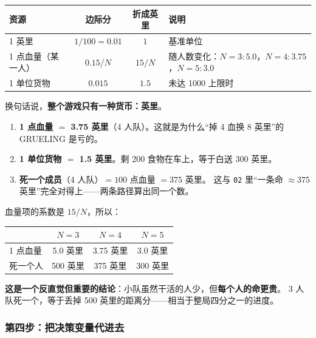 \documentclass[UTF8,11pt,a4paper]{ctexart}
\begin{document}
\begin{center}
\begin{tabular}{@{}lccl@{}}
\toprule
\textbf{资源} & \textbf{边际分} & \textbf{折成英里} & \textbf{说明} \\
\midrule
1 英里 & $1/100=0.01$ & $1$ & 基准单位 \\
1 点血量（某一人） & $0.15/N$ & $15/N$ & 随人数变化：$N{=}3{:}5.0$，$N{=}4{:}3.75$，$N{=}5{:}3.0$ \\
1 单位货物 & $0.015$ & $1.5$ & 未达 1000 上限时 \\
\bottomrule
\end{tabular}
\end{center}

\noindent 换句话说，\textbf{整个游戏只有一种货币：英里}。

\begin{keybox}[title={三个可以直接用于决策的换算}]
\begin{enumerate}[leftmargin=1.6em]
  \item \textbf{1 点血量 $=$ 3.75 英里}（4 人队）。这就是为什么“掉 4 血换 8 英里”的 GRUELING 是亏的。
  \item \textbf{1 单位货物 $=$ 1.5 英里}。剩 200 食物在车上，等于白送 300 英里。
  \item \textbf{死一个成员}（4 人队）$=100$ 点血量 $=375$ 英里。
        这与 \texttt{02} 里“一条命 $\approx375$ 英里”完全对得上——两条路径算出同一个数。
\end{enumerate}
\end{keybox}

\begin{warnbox}[title={人数越少，每个人越值钱}]
血量项的系数是 $15/N$，所以：
\begin{center}
\begin{tabular}{@{}lccc@{}}
\toprule
& $N=3$ & $N=4$ & $N=5$ \\
\midrule
1 点血量 & 5.0 英里 & 3.75 英里 & 3.0 英里 \\
死一个人 & 500 英里 & 375 英里 & 300 英里 \\
\bottomrule
\end{tabular}
\end{center}
\textbf{这是一个反直觉但重要的结论}：小队虽然干活的人少，但\textbf{每个人的命更贵}。
3 人队死一个，等于丢掉 500 英里的距离分——相当于整局四分之一的进度。
\end{warnbox}

\subsubsection*{第四步：把决策变量代进去}
\end{document}
